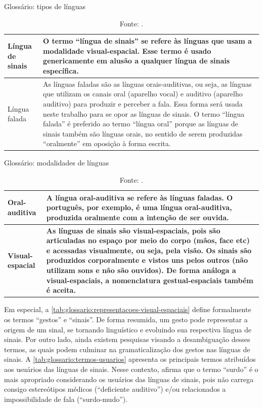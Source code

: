 \begin{table}[htbp]
\caption{Glossário: tipos de línguas}
\label{tab:glossario:tipos-linguas}
\begin{tabularx}{\textwidth}{l|X} \hline
\textbf{Língua de sinais} & \textbf{O termo ``língua de sinais'' se refere às línguas que usam a modalidade visual-espacial. Esse termo é usado genericamente em alusão a qualquer língua de sinais específica.} \\ \hline
Língua falada & As línguas faladas são as línguas orais-auditivas, ou seja, as línguas que utilizam os canais oral (aparelho vocal) e auditivo (aparelho auditivo) para produzir e perceber a fala. Essa forma será usada neste trabalho para se opor as línguas de sinais. O termo ``língua falada'' é preferido ao termo ``língua oral'' porque as línguas de sinais também são línguas orais, no sentido de serem produzidas ``oralmente'' em oposição à forma escrita. \\ \hline
\end{tabularx}
\caption*{Fonte: .}
\end{table}

\begin{table}[htbp]
\caption{Glossário: modalidades de línguas}
\label{tab:glossario:modalidades-linguas}
\begin{tabularx}{\textwidth}{l|X} \hline
Oral-auditiva & A língua oral-auditiva se refere às línguas faladas. O português, por exemplo, é uma língua oral-auditiva, produzida oralmente com a intenção de ser ouvida. \\ \hline
\textbf{Visual-espacial} & \textbf{As línguas de sinais são visual-espaciais, pois são articuladas no espaço por meio do corpo (mãos, face etc) e acessadas visualmente, ou seja, pela visão. Os sinais são produzidos corporalmente e vistos uns pelos outros (não utilizam sons e não são ouvidos). De forma análoga a visual-espaciais, a nomenclatura gestual-espaciais também é aceita.} \\ \hline
\end{tabularx}
\caption*{Fonte: .}
\end{table}

Em especial, a \autoref{tab:glossario:representacoes-visual-espaciais} define formalmente os termos ``gestos'' e ``sinais''. De forma resumida, um gesto pode representar a origem de um sinal, se tornando linguístico e evoluindo sua respectiva língua de sinais. Por outro lado, ainda existem pesquisas visando a desambiguação desses termos, as quais podem culminar na gramaticalização dos gestos nas línguas de sinais. A \autoref{tab:glossario:termos-usuarios} apresenta os principais termos atribuídos aos usuários das línguas de sinais. Nesse contexto,  afirma que o termo ``surdo'' é o mais apropriado considerando os usuários das línguas de sinais, pois não carrega consigo estereótipos médicos (``deficiente auditivo'') e/ou relacionados a impossibilidade de fala (``surdo-mudo'').

